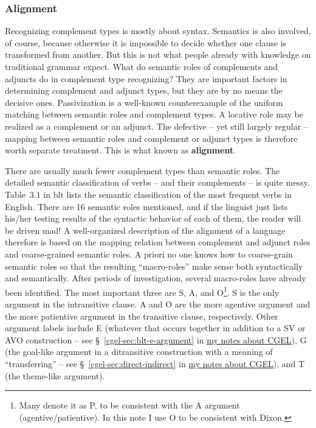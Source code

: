 \documentclass{article}
\newcommand*{\citesec}[1]{\S~{#1}}
\newcommand*{\citetable}[1]{Table~{#1}}
\newcommand*{\concept}[1]{\textbf{#1}}
\newcommand{\cgel}{\href{../English/cambridge.pdf}{my notes about CGEL}}
\begin{document}
\subsubsection{Alignment}\label{sec:alignment}

Recognizing complement types is mostly about syntax.
Semantics is also involved, of course, 
because otherwise it is impossible to decide whether one clause is transformed from another.
But this is not what people already with knowledge on traditional grammar expect.
What do semantic roles of complements and adjuncts 
do in complement type recognizing?
They are important factors in determining complement and adjunct types,
but they are by no means the decisive ones.
Passivization is a well-known counterexample of the uniform matching between semantic roles and complement types.
A locative role may be realized as a complement or an adjunct.
The defective -- yet still largely regular -- mapping between semantic roles and complement or adjunct types 
is therefore worth separate treatment.
This is what known as \concept{alignment}.

There are usually much fewer complement types than semantic roles.
The detailed semantic classification of verbs -- and their complements -- is quite messy. 
\citetable{3.1} in \ac{blt} lists the semantic classification of the most frequent verbs in English.
There are 16 semantic roles mentioned, 
and if the linguist just lists his/her testing results of the syntactic behavior of each of them,
the reader will be driven mad!
A well-organized description of the alignment of a language therefore is based on 
the mapping relation between complement and adjunct roles and coarse-grained semantic roles.
A priori no one knows how to coarse-grain semantic roles 
so that the resulting ``macro-roles'' make sense both syntactically and semantically.
After periods of investigation, several macro-roles have already been identified.
The most important three are S, A, and O\footnote{
    Many denote it as P, to be consistent with the A argument (agentive/patientive). 
    In this note I use O to be consistent with Dixon.
}.
S is the only argument in the intransitive clause.
A and O are the more agentive argument and the more patientive argument in the transitive clause, 
respectively.
Other argument labels include E 
(whatever that occurs together in addition to a SV or AVO construction
-- see \citesec{\ref{cgel-sec:blt-e-argument}} in \cgel),
G (the goal-like argument in a ditransitive construction with a meaning of ``transferring''
-- see \citesec{\ref{cgel-sec:direct-indirect}} in \cgel),
and T (the theme-like argument).
\end{document}
